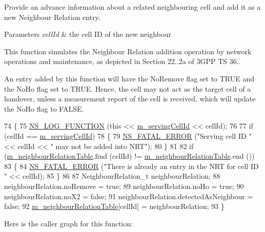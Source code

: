 Provide an advance information about a related neighbouring cell and add it as a new Neighbour Relation entry. 


\begin{DoxyParams}{Parameters}
{\em cell\+Id} & the cell ID of the new neighbour\\
\hline
\end{DoxyParams}
This function simulates the Neighbour Relation addition operation by network operations and maintenance, as depicted in Section 22..\+2a of 3\+G\+PP TS 36..

An entry added by this function will have the No\+Remove flag set to T\+R\+UE and the No\+Ho flag set to T\+R\+UE. Hence, the cell may not act as the target cell of a handover, unless a measurement report of the cell is received, which will update the No\+Ho flag to F\+A\+L\+SE. 
\begin{DoxyCode}
74 \{
75   \hyperlink{log-macros-disabled_8h_a90b90d5bad1f39cb1b64923ea94c0761}{NS\_LOG\_FUNCTION} (\textcolor{keyword}{this} << \hyperlink{classns3_1_1LteAnr_a9a2e5aef479439b1f909f46f260f7092}{m\_servingCellId} << cellId);
76 
77   \textcolor{keywordflow}{if} (cellId == \hyperlink{classns3_1_1LteAnr_a9a2e5aef479439b1f909f46f260f7092}{m\_servingCellId})
78     \{
79       \hyperlink{group__fatal_ga5131d5e3f75d7d4cbfd706ac456fdc85}{NS\_FATAL\_ERROR} (\textcolor{stringliteral}{"Serving cell ID "} << cellId << \textcolor{stringliteral}{" may not be added into NRT"});
80     \}
81 
82   \textcolor{keywordflow}{if} (\hyperlink{classns3_1_1LteAnr_a90fc8417020463e795dc960f2f53bc24}{m\_neighbourRelationTable}.find (cellId) != 
      \hyperlink{classns3_1_1LteAnr_a90fc8417020463e795dc960f2f53bc24}{m\_neighbourRelationTable}.end ())
83     \{
84       \hyperlink{group__fatal_ga5131d5e3f75d7d4cbfd706ac456fdc85}{NS\_FATAL\_ERROR} (\textcolor{stringliteral}{"There is already an entry in the NRT for cell ID "} << cellId);
85     \}
86 
87   NeighbourRelation\_t neighbourRelation;
88   neighbourRelation.noRemove = \textcolor{keyword}{true};
89   neighbourRelation.noHo = \textcolor{keyword}{true};
90   neighbourRelation.noX2 = \textcolor{keyword}{false};
91   neighbourRelation.detectedAsNeighbour = \textcolor{keyword}{false};
92   \hyperlink{classns3_1_1LteAnr_a90fc8417020463e795dc960f2f53bc24}{m\_neighbourRelationTable}[cellId] = neighbourRelation;
93 \}
\end{DoxyCode}


Here is the caller graph for this function\+:


